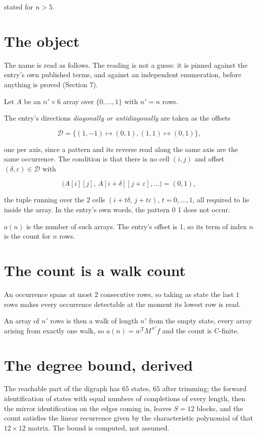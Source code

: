 \documentclass[11pt]{article}
\theoremstyle{definition}
\begin{document}
stated for $n > 5$.

\section{The object}

The name is read as follows. The reading is not a guess: it is pinned against the entry's own published terms, and against an independent enumeration, before anything is proved (Section 7).

Let $A$ be an $n' \times 6$ array over $\{0,\dots,1\}$ with $n' = n$ rows.

The entry's directions {\itshape diagonally or antidiagonally} are taken as the offsets

\[\mathcal{D} = \{(1,-1)\mapsto(0,1), (1,1)\mapsto(0,1)\},\]

one per axis, since a pattern and its reverse read along the same axis are the same occurrence. The condition is that there is no cell $(i,j)$ and offset $(\delta,\varepsilon)\in\mathcal{D}$ with

\[\bigl(A[i][j],\,A[i{+}\delta][j{+}\varepsilon],\dots\bigr) = (0, 1),\]

the tuple running over the $2$ cells $(i+t\delta,\,j+t\varepsilon)$, $t = 0,\dots,1$, all required to lie inside the array. In the entry's own words, the pattern 0 1 does not occur.

$a(n)$ is the number of such arrays. The entry's offset is 1, so its term of index $n$ is the count for $n$ rows.

\section{The count is a walk count}

An occurrence spans at most $2$ consecutive rows, so taking as state the last $1$ rows makes every occurrence detectable at the moment its lowest row is read.

An array of $n'$ rows is then a walk of length $n'$ from the empty state, every array arising from exactly one walk, so $a(n) = w^{\mathsf T}M^{\,n'}f$ and the count is C-finite.

\section{The degree bound, derived}

The reachable part of the digraph has $65$ states, $65$ after trimming; the forward identification of states with equal numbers of completions of every length, then the mirror identification on the edges coming in, leaves $S = 12$ blocks, and the count satisfies the linear recurrence given by the characteristic polynomial of that $12\times12$ matrix. The bound is computed, not assumed.
\end{document}
